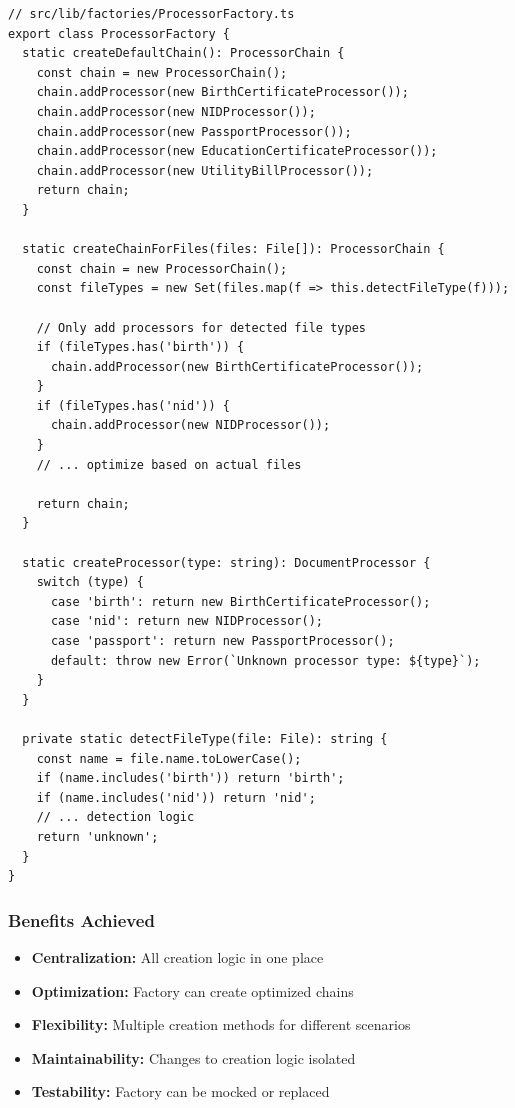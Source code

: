 \documentclass[11pt, a4paper]{article}
\theoremstyle{plain}
\theoremstyle{definition}
\begin{document}
\begin{lstlisting}[caption={Factory Pattern Implementation}]
// src/lib/factories/ProcessorFactory.ts
export class ProcessorFactory {
  static createDefaultChain(): ProcessorChain {
    const chain = new ProcessorChain();
    chain.addProcessor(new BirthCertificateProcessor());
    chain.addProcessor(new NIDProcessor());
    chain.addProcessor(new PassportProcessor());
    chain.addProcessor(new EducationCertificateProcessor());
    chain.addProcessor(new UtilityBillProcessor());
    return chain;
  }
  
  static createChainForFiles(files: File[]): ProcessorChain {
    const chain = new ProcessorChain();
    const fileTypes = new Set(files.map(f => this.detectFileType(f)));
    
    // Only add processors for detected file types
    if (fileTypes.has('birth')) {
      chain.addProcessor(new BirthCertificateProcessor());
    }
    if (fileTypes.has('nid')) {
      chain.addProcessor(new NIDProcessor());
    }
    // ... optimize based on actual files
    
    return chain;
  }
  
  static createProcessor(type: string): DocumentProcessor {
    switch (type) {
      case 'birth': return new BirthCertificateProcessor();
      case 'nid': return new NIDProcessor();
      case 'passport': return new PassportProcessor();
      default: throw new Error(`Unknown processor type: ${type}`);
    }
  }
  
  private static detectFileType(file: File): string {
    const name = file.name.toLowerCase();
    if (name.includes('birth')) return 'birth';
    if (name.includes('nid')) return 'nid';
    // ... detection logic
    return 'unknown';
  }
}
\end{lstlisting}

\subsubsection{Benefits Achieved}

\begin{itemize}
    \item \textbf{Centralization:} All creation logic in one place
    \item \textbf{Optimization:} Factory can create optimized chains
    \item \textbf{Flexibility:} Multiple creation methods for different scenarios
    \item \textbf{Maintainability:} Changes to creation logic isolated
    \item \textbf{Testability:} Factory can be mocked or replaced
\end{itemize}
\end{document}
